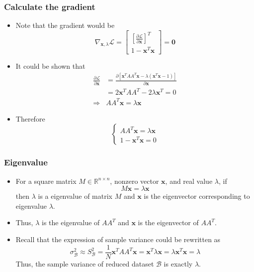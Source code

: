 \documentclass[serif]{beamer}
\begin{document}
\begin{frame}
    \frametitle{Calculate the gradient}
    \begin{itemize}
        \item Note that the gradient would be
        $$
        \nabla_{\mathbf{x},\lambda}\mathcal{L} = 
        \begin{bmatrix}
            \left[\frac{\partial \mathcal{L}}{\partial \mathbf{x}}\right]^T\\
            1 - \mathbf{x}^T\mathbf{x}
        \end{bmatrix} = \mathbf{0}
        $$
        \item It could be shown that
        $$
        \begin{aligned}
            \frac{\partial\mathcal{L}}{\partial \mathbf{x}} &= \frac{\partial [\mathbf{x}^TAA^T\mathbf{x} - \lambda(\mathbf{x}^T\mathbf{x} - 1)]}{\partial \mathbf{x}}\\
            &= 2\mathbf{x}^TAA^T - 2\lambda\mathbf{x}^T = 0\\
            \Rightarrow &AA^T\mathbf{x} = \lambda\mathbf{x}
        \end{aligned}
        $$
        \item Therefore
        $$
        \begin{cases}
            AA^T\mathbf{x} = \lambda\mathbf{x}\\
            1 - \mathbf{x}^T\mathbf{x} = 0
        \end{cases}
        $$
    \end{itemize}
\end{frame}

\begin{frame}
    \frametitle{Eigenvalue}
    \begin{itemize}
        \item For a square matrix $M\in\mathbb{R}^{n\times n}$, nonzero vector $\mathbf{x}$, and real value $\lambda$, if
        $$
        M\mathbf{x} = \lambda\mathbf{x}
        $$
        then $\lambda$ is a eigenvalue of matrix $M$ and $\mathbf{x}$ is the eigenvector corresponding to eigenvalue $\lambda$.
        \item Thus, $\lambda$ is the eigenvalue of $AA^T$ and $\mathbf{x}$ is the eigenvector of $AA^T$.
        \item Recall that the expression of sample variance could be rewritten as
        $$
        \sigma_\mathcal{B}^2 \approx S^2_\mathcal{B} = \frac{1}{N}\mathbf{x}^TAA^T\mathbf{x} = \mathbf{x}^T\lambda\mathbf{x} = \lambda\mathbf{x}^T\mathbf{x} = \lambda
        $$
        Thus, the sample variance of reduced dataset $\mathcal{B}$ is exactly $\lambda$.
    \end{itemize}
\end{frame}
\end{document}
